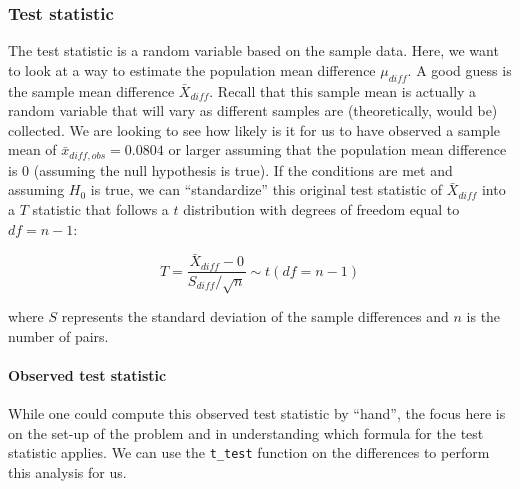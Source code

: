 \documentclass[12pt,]{krantz}
\makeatletter
\newenvironment{Shaded}{\begin{snugshade}}{\end{snugshade}}
\newcommand{\KeywordTok}[1]{\textcolor[rgb]{0.27,0.27,0.27}{\textbf{#1}}}
\newcommand{\DataTypeTok}[1]{\textcolor[rgb]{0.27,0.27,0.27}{#1}}
\newcommand{\DecValTok}[1]{\textcolor[rgb]{0.06,0.06,0.06}{#1}}
\newcommand{\StringTok}[1]{\textcolor[rgb]{0.5,0.5,0.5}{#1}}
\newcommand{\OtherTok}[1]{\textcolor[rgb]{0.37,0.37,0.37}{#1}}
\newcommand{\OperatorTok}[1]{\textcolor[rgb]{0.43,0.43,0.43}{\textbf{#1}}}
\newcommand{\NormalTok}[1]{#1}
\let\oldparagraph\paragraph
\renewcommand{\paragraph}[1]{\oldparagraph{#1}\mbox{}}
\newenvironment{kframe}{%
\medskip{}
\setlength{\fboxsep}{.8em}
 \def\at@end@of@kframe{}%
 \ifinner\ifhmode%
  \def\at@end@of@kframe{\end{minipage}}%
  \begin{minipage}{\columnwidth}%
 \fi\fi%
 \def\FrameCommand##1{\hskip\@totalleftmargin \hskip-\fboxsep
 \colorbox{shadecolor}{##1}\hskip-\fboxsep
     \hskip-\linewidth \hskip-\@totalleftmargin \hskip\columnwidth}%
 \MakeFramed {\advance\hsize-\width
   \@totalleftmargin\z@ \linewidth\hsize
   \@setminipage}}%
 {\par\unskip\endMakeFramed%
 \at@end@of@kframe}
\renewenvironment{Shaded}{\begin{kframe}}{\end{kframe}}
\makeatother
\begin{document}
\subsubsection*{Test statistic}\label{test-statistic-4}


The test statistic is a random variable based on the sample data. Here,
we want to look at a way to estimate the population mean difference
\(\mu_{diff}\). A good guess is the sample mean difference
\(\bar{X}_{diff}\). Recall that this sample mean is actually a random
variable that will vary as different samples are (theoretically, would
be) collected. We are looking to see how likely is it for us to have
observed a sample mean of \(\bar{x}_{diff, obs} = 0.0804\) or larger
assuming that the population mean difference is 0 (assuming the null
hypothesis is true). If the conditions are met and assuming \(H_0\) is
true, we can ``standardize'' this original test statistic of
\(\bar{X}_{diff}\) into a \(T\) statistic that follows a \(t\)
distribution with degrees of freedom equal to \(df = n - 1\):

\[ T =\dfrac{ \bar{X}_{diff} - 0}{ S_{diff} / \sqrt{n} } \sim t (df = n - 1) \]

where \(S\) represents the standard deviation of the sample differences
and \(n\) is the number of pairs.

\paragraph{Observed test statistic}\label{observed-test-statistic-4}

While one could compute this observed test statistic by ``hand'', the
focus here is on the set-up of the problem and in understanding which
formula for the test statistic applies. We can use the \texttt{t\_test}
function on the differences to perform this analysis for us.

\begin{Shaded}
\end{Shaded}
\end{document}
